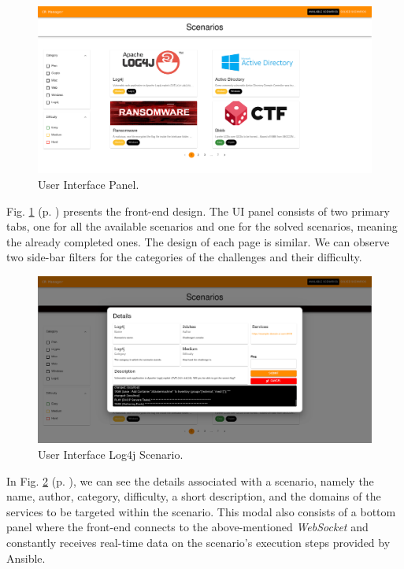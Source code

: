 \begin{figure}[H]
    \includegraphics[width=13cm]{figures/ui_dashboard.png}
    \caption{User Interface Panel.}
    \label{fig:ui_panel}
\end{figure}

Fig. \ref{fig:ui_panel} (p. \pageref{fig:ui_panel}) presents the front-end design. The UI panel consists of two primary tabs, one for all the available scenarios and one for the solved scenarios, meaning the already completed ones. The design of each page is similar. We can observe two side-bar filters for the categories of the challenges and their difficulty. 

\begin{figure}[H]
    \includegraphics[width=13cm]{figures/ui_example_scenario.png}
    \caption{User Interface Log4j Scenario.}
    \label{fig:ui_log4j_scenario}
\end{figure}

In Fig. \ref{fig:ui_log4j_scenario} (p. \pageref{fig:ui_log4j_scenario}), we can see the details associated with a scenario, namely the name, author, category, difficulty, a short description, and the domains of the services to be targeted within the scenario. This modal also consists of a bottom panel where the front-end connects to the above-mentioned \textit{WebSocket} and constantly receives real-time data on the scenario's execution steps provided by Ansible. 

